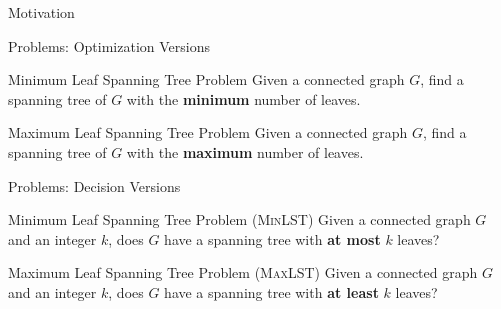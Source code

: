 \documentclass{beamer}
\begin{document}
\begin{frame}{Motivation}
    
\end{frame}


\begin{frame}{Problems: Optimization Versions}

\begin{exampleblock}{Minimum Leaf Spanning Tree Problem}
 Given a connected graph $G$, find a spanning tree of $G$ with the \textbf{minimum} number of leaves.
\end{exampleblock}
\vspace{0.7 cm}
\begin{exampleblock}{Maximum Leaf Spanning Tree Problem}
 Given a connected graph $G$, find a spanning tree of $G$ with the \textbf{maximum} number of leaves.
\end{exampleblock}

\end{frame}

\begin{frame}{Problems: Decision Versions}

\begin{exampleblock}{Minimum Leaf Spanning Tree Problem \textsc{(MinLST)}}
 Given a connected graph $G$ and an integer $k$, does $G$ have a spanning tree with \textbf{at most} $k$ leaves?
\end{exampleblock}
\vspace{0.7 cm}
\begin{exampleblock}{Maximum Leaf Spanning Tree Problem \textsc{(MaxLST)}}
 Given a connected graph $G$ and an integer $k$, does $G$ have a spanning tree with \textbf{at least} $k$ leaves?
\end{exampleblock}

\end{frame}

\end{document}
